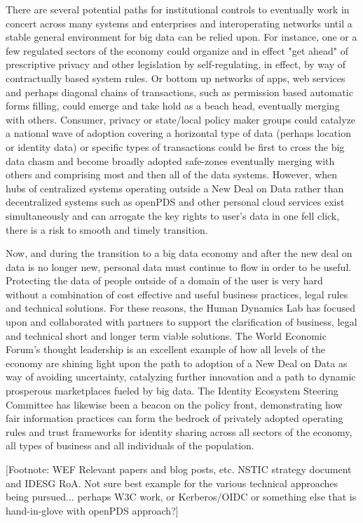There are several potential paths for institutional controls to eventually work in concert across many systems and enterprises and interoperating networks until a stable general environment for big data can be relied upon.
For instance, one or a few regulated sectors of the economy could organize and in effect "get ahead" of prescriptive privacy and other legislation by self-regulating, in effect, by way of contractually based system rules.
Or bottom up networks of apps, web services and perhaps diagonal chains of transactions, such as permission based automatic forms filling, could emerge and take hold as a beach head, eventually merging with others.
Consumer, privacy or state/local policy maker groups could catalyze a national wave of adoption covering a horizontal type of data (perhaps location or identity data) or specific types of transactions could be first to cross the big data chasm and become broadly adopted safe-zones eventually merging with others and comprising most and then all of the data systems.
However, when hubs of centralized systems operating outside a New Deal on Data rather than decentralized systems such as openPDS and other personal cloud services exist simultaneously and can arrogate the key rights to user's data in one fell click, there is a risk to smooth and timely transition.

Now, and during the transition to a big data economy and after the new deal on data is no longer new, personal data must continue to flow in order to be useful.
Protecting the data of people outside of a domain of the user is very hard without a combination of cost effective and useful business practices, legal rules and technical solutions.
For these reasons, the Human Dynamics Lab has focused upon and collaborated with partners to support the clarification of business, legal and technical short and longer term viable solutions.
The World Economic Forum's thought leadership is an excellent example of how all levels of the economy are shining light upon the path to adoption of a New Deal on Data as way of avoiding uncertainty, catalyzing further innovation and a path to dynamic prosperous marketplaces fueled by big data.
The Identity Ecosystem Steering Committee has likewise been a beacon on the policy front, demonstrating how fair information practices can form the bedrock of privately adopted operating rules and trust frameworks for identity sharing across all sectors of the economy, all types of business and all individuals of the population.

[Footnote: WEF Relevant papers and blog posts, etc. NSTIC strategy document and IDESG RoA. Not sure best example for the various technical approaches being pursued... perhaps W3C work, or Kerberos/OIDC or something else that is hand-in-glove with openPDS approach?]

